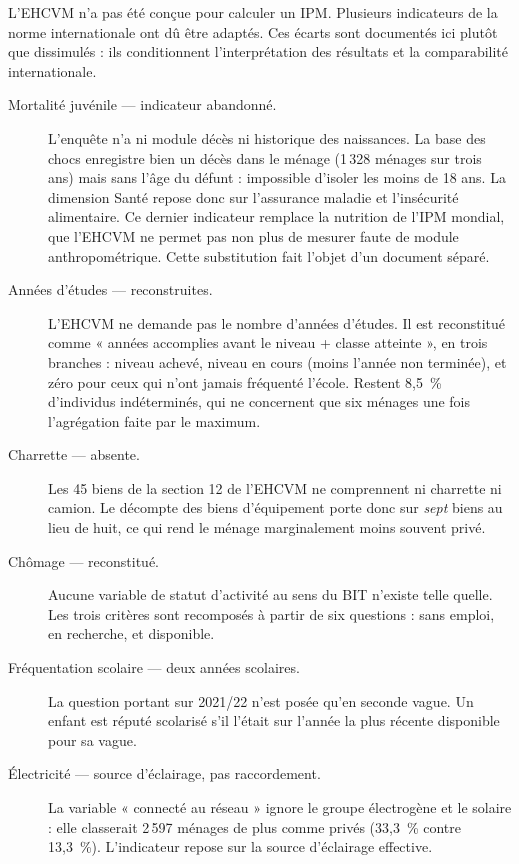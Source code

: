 \documentclass[11pt,a4paper]{article}
\begin{document}
L'EHCVM n'a pas été conçue pour calculer un IPM. Plusieurs indicateurs de la norme internationale
ont dû être adaptés. Ces écarts sont documentés ici plutôt que dissimulés : ils conditionnent
l'interprétation des résultats et la comparabilité internationale.

\begin{description}
  \item[Mortalité juvénile --- indicateur abandonné.] L'enquête n'a ni module décès ni historique
  des naissances. La base des chocs enregistre bien un décès dans le ménage (1\,328 ménages sur
  trois ans) mais sans l'âge du défunt : impossible d'isoler les moins de 18 ans. La dimension
  Santé repose donc sur l'assurance maladie et l'insécurité alimentaire. Ce dernier indicateur
  remplace la nutrition de l'IPM mondial, que l'EHCVM ne permet pas non plus de mesurer faute de
  module anthropométrique. Cette substitution fait l'objet d'un document séparé.

  \item[Années d'études --- reconstruites.] L'EHCVM ne demande pas le nombre d'années d'études.
  Il est reconstitué comme « années accomplies avant le niveau + classe atteinte », en trois
  branches : niveau achevé, niveau en cours (moins l'année non terminée), et zéro pour ceux qui
  n'ont jamais fréquenté l'école. Restent 8,5~\% d'individus indéterminés, qui ne concernent que
  six ménages une fois l'agrégation faite par le maximum.

  \item[Charrette --- absente.] Les 45 biens de la section 12 de l'EHCVM ne comprennent ni
  charrette ni camion. Le décompte des biens d'équipement porte donc sur \emph{sept} biens au lieu
  de huit, ce qui rend le ménage marginalement moins souvent privé.

  \item[Chômage --- reconstitué.] Aucune variable de statut d'activité au sens du BIT n'existe
  telle quelle. Les trois critères sont recomposés à partir de six questions : sans emploi, en
  recherche, et disponible.

  \item[Fréquentation scolaire --- deux années scolaires.] La question portant sur 2021/22 n'est
  posée qu'en seconde vague. Un enfant est réputé scolarisé s'il l'était sur l'année la plus
  récente disponible pour sa vague.

  \item[Électricité --- source d'éclairage, pas raccordement.] La variable « connecté au réseau »
  ignore le groupe électrogène et le solaire : elle classerait 2\,597 ménages de plus comme privés
  (33,3~\% contre 13,3~\%). L'indicateur repose sur la source d'éclairage effective.
\end{description}
\end{document}
